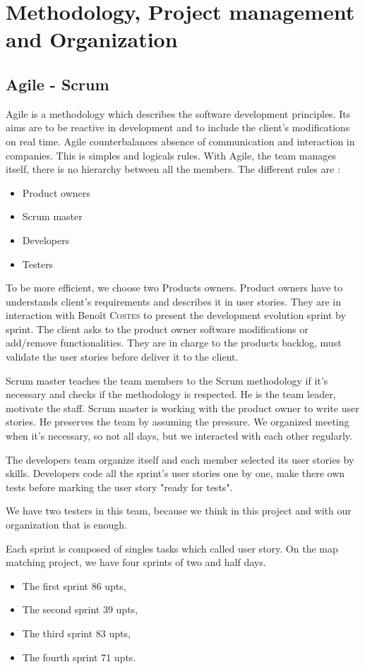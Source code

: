 \chapter{Methodology, Project management and Organization}

\section{Agile - Scrum}

Agile is a methodology which describes the software development principles. Its aims are to be reactive in development and to include the client's modifications on real time.
Agile counterbalances absence of communication and interaction in companies.
This is simples and logicals rules.
With Agile, the team manages itself, there is no hierarchy between all the members.
The different rules are :
\begin{itemize}
	\item Product owners
	\item Scrum master
	\item Developers
	\item Testers
\end{itemize}
To be more efficient, we choose two Products owners.
Product owners have to understands client's requirements and describes it in user stories. They are in interaction with Benoît \textsc{Costes} to present the development evolution sprint by sprint. The client asks to the product owner software modifications or add/remove functionalities.
They are in charge to the products backlog, must validate the user stories before deliver it to the client.

Scrum master teaches the team members to the Scrum methodology if it's necessary and checks if the methodology is respected.
He is the team leader, motivate the staff.
Scrum master is working with the product owner to write user stories.
He preserves the team by assuming the pressure.
We organized meeting when it's necessary, so not all days, but we interacted with each other regularly.

The developers team organize itself and each member selected its user stories by skills.
Developers code all the sprint's user stories one by one, make there own tests before marking the user story "ready for tests".

We have two testers in this team, because we think in this project and with our organization that is enough.

Each sprint is composed of singles tasks which called user story.
On the map matching project, we have four sprints of two and half days.
\begin{itemize}
	\item The first sprint 86 upts,
	\item The second sprint 39 upts,
	\item The third sprint 83 upts,
	\item The fourth sprint 71 upts.
\end{itemize}

